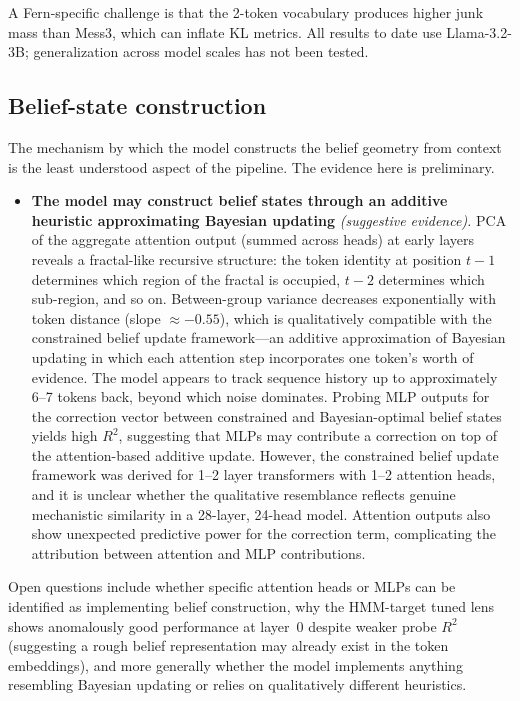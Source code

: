 \documentclass[midterm]{sparreport}
\begin{document}
A Fern-specific challenge is that the 2-token vocabulary produces higher junk mass than Mess3, which can inflate KL metrics. All results to date use Llama-3.2-3B; generalization across model scales has not been tested.

\subsection{Belief-state construction}

The mechanism by which the model constructs the belief geometry from context is the least understood aspect of the pipeline. The evidence here is preliminary.

\begin{itemize}
  \item \textbf{The model may construct belief states through an additive heuristic approximating Bayesian updating} \emph{(suggestive evidence).}
  PCA of the aggregate attention output (summed across heads) at early layers reveals a fractal-like recursive structure: the token identity at position $t{-}1$ determines which region of the fractal is occupied, $t{-}2$ determines which sub-region, and so on. Between-group variance decreases exponentially with token distance (slope $\approx -0.55$), which is qualitatively compatible with the constrained belief update framework---an additive approximation of Bayesian updating in which each attention step incorporates one token's worth of evidence. The model appears to track sequence history up to approximately 6--7 tokens back, beyond which noise dominates. Probing MLP outputs for the correction vector between constrained and Bayesian-optimal belief states yields high $R^2$, suggesting that MLPs may contribute a correction on top of the attention-based additive update. However, the constrained belief update framework was derived for 1--2 layer transformers with 1--2 attention heads, and it is unclear whether the qualitative resemblance reflects genuine mechanistic similarity in a 28-layer, 24-head model. Attention outputs also show unexpected predictive power for the correction term, complicating the attribution between attention and MLP contributions.
\end{itemize}

Open questions include whether specific attention heads or MLPs can be identified as implementing belief construction, why the HMM-target tuned lens shows anomalously good performance at layer~0 despite weaker probe $R^2$ (suggesting a rough belief representation may already exist in the token embeddings), and more generally whether the model implements anything resembling Bayesian updating or relies on qualitatively different heuristics.
\end{document}
